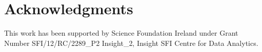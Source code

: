 \section*{Acknowledgments}
\label{sec:acknowledgments}

This work has been supported by Science Foundation Ireland under Grant
Number SFI/12/RC/2289\_P2 Insight\_2, Insight SFI Centre for Data
Analytics.
